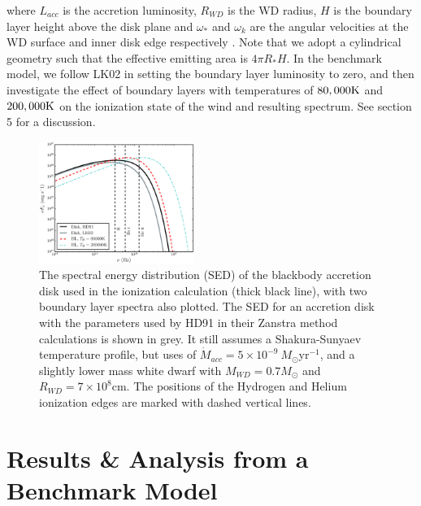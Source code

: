 \documentclass[preprint, a4paper, 11pt]{aastex}
\begin{document}
where $L_{acc}$ is the accretion luminosity, $R_{WD}$ is the WD radius, $H$ is the boundary layer height
above the disk plane
and $\omega_*$ and $\omega_k$ are the angular velocities at the WD surface and inner disk edge respectively
\citep{fkrbook}. Note that we adopt a cylindrical geometry such that the effective emitting
area is $4 \pi R_* H$. 
In the benchmark model, we follow LK02 in setting the boundary layer
luminosity to zero, and then investigate the effect
of boundary layers with temperatures of $80,000{\rm K}$ and $200,000{\rm K}$ 
on the ionization state of the wind and resulting
spectrum. See section 5 for a discussion.


\begin{figure}
\centering
\includegraphics[width=0.45\textwidth]{figures/sed_figure.eps}
\caption{
The spectral energy distribution (SED) of the blackbody accretion
disk used in the ionization calculation (thick black line), 
with two boundary layer spectra also plotted.
The SED for an accretion disk
with the parameters used by HD91 in their Zanstra method calculations is shown in grey. 
It still assumes a Shakura-Sunyaev temperature profile, but uses
of $\dot{M}_{acc}= 5\times10^{-9}~M_{\odot}$yr$^{-1}$, and a slightly lower mass
white dwarf with $M_{WD}=0.7 M_{\odot}$ and $R_{WD} = 7\times10^{8}$cm.
The positions of the Hydrogen and Helium ionization edges 
are marked with dashed vertical lines.
}
\label{sed}
\end{figure}


%
%

\section{Results \& Analysis from a Benchmark Model}
\end{document}
